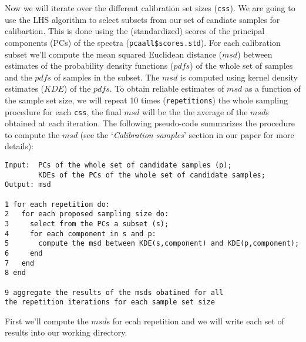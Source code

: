 \documentclass[]{book}
\begin{document}
Now we will iterate over the different calibration set sizes (\texttt{css}). We are going to use the LHS algorithm to select subsets from our set of candiate samples for calibartion. This is done using the (standardized) scores of the principal components (PCs) of the spectra (\texttt{pcaall\$scores.std}). For each calibration subset we'll compute the mean squared Euclidean distance (\(msd\)) between estimates of the probability density functions (\(pdfs\)) of the whole set of samples and the \(pdfs\) of samples in the subset. The \(msd\) is computed using kernel density estimates (\(KDE\)) of the \(pdfs\). To obtain reliable estimates of \(msd\) as a function of the sample set size, we will repeat 10 times (\texttt{repetitions}) the whole sampling procedure for each \texttt{css}, the final \(msd\) will be the the average of the \(msd\)s obtained at each iteration.
The following pseudo-code summarizes the procedure to compute the \(msd\) (see the `\emph{Calibration samples}' section in our paper for more details):

\begin{verbatim}
Input:  PCs of the whole set of candidate samples (p);
        KDEs of the PCs of the whole set of candidate samples;
Output: msd

1 for each repetition do:
2   for each proposed sampling size do:
3     select from the PCs a subset (s);
4     for each component in s and p:
5       compute the msd between KDE(s,component) and KDE(p,component);
6     end
7   end
8 end

9 aggregate the results of the msds obatined for all 
the repetition iterations for each sample set size
\end{verbatim}

First we'll compute the \(msd\)s for ecah repetition and we will write each set of results into our working directory.
\end{document}
